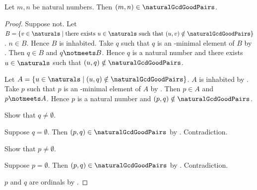 \begin{theorem}\label{every_natural_pair_is_gcd_good}
    Let $m,n$ be natural numbers.
    Then $(m,n)\in\naturalGcdGoodPairs$.
\end{theorem}
\begin{proof}
    Suppose not.
    Let $B=\{v\in\naturals\mid
        \text{there exists $u\in\naturals$ such that
            $(u,v)\notin\naturalGcdGoodPairs$}\}$.
    $n\in B$.
    Hence $B$ is inhabited.
    Take $q$ such that $q$ is an \in-minimal element of $B$
        by .
    Then $q\in B$ and $q\notmeets B$.
    Hence $q$ is a natural number and
        there exists $u\in\naturals$ such that
            $(u,q)\notin\naturalGcdGoodPairs$.

    Let $A=\{u\in\naturals\mid
        (u,q)\notin\naturalGcdGoodPairs\}$.
    $A$ is inhabited by \auto.
    Take $p$ such that $p$ is an \in-minimal element of $A$
        by .
    Then $p\in A$ and $p\notmeets A$.
    Hence $p$ is a natural number and
        $(p,q)\notin\naturalGcdGoodPairs$.

    Show that $q\neq\emptyset$.
    \begin{subproof}
        Suppose $q=\emptyset$.
        Then $(p,q)\in\naturalGcdGoodPairs$
            by .
        Contradiction.
    \end{subproof}
    Show that $p\neq\emptyset$.
    \begin{subproof}
        Suppose $p=\emptyset$.
        Then $(p,q)\in\naturalGcdGoodPairs$
            by .
        Contradiction.
    \end{subproof}
    $p$ and $q$ are ordinals by .


\end{proof}
